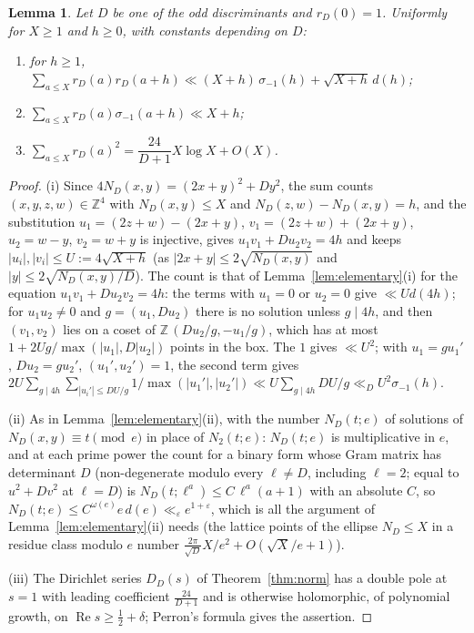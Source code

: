 \documentclass[11pt]{amsart}
\newtheorem{lemma}[theorem]{Lemma}
\theoremstyle{remark}
\newcommand{\Z}{\mathbb{Z}}
\newcommand{\e}{\varepsilon}
\begin{document}
\begin{lemma}\label{lem:elementaryD}
Let $D$ be one of the odd discriminants and $r_D(0)=1$. Uniformly for $X\ge1$ and $h\ge0$, with constants depending on $D$:
\begin{enumerate}[label=\textup{(\roman*)},leftmargin=2.2em]
\item for $h\ge1$, $\sum_{a\le X}r_D(a)r_D(a+h)\ll(X+h)\,\sigma_{-1}(h)+\sqrt{X+h}\,d(h)$;
\item $\sum_{a\le X}r_D(a)\sigma_{-1}(a+h)\ll X+h$;
\item $\sum_{a\le X}r_D(a)^2=\dfrac{24}{D+1}X\log X+O(X)$.
\end{enumerate}
\end{lemma}
\begin{proof}
(i) Since $4N_D(x,y)=(2x+y)^2+Dy^2$, the sum counts $(x,y,z,w)\in\Z^4$ with $N_D(x,y)\le X$ and $N_D(z,w)-N_D(x,y)=h$, and the substitution $u_1=(2z+w)-(2x+y)$, $v_1=(2z+w)+(2x+y)$, $u_2=w-y$, $v_2=w+y$ is injective, gives $u_1v_1+Du_2v_2=4h$ and keeps $|u_i|,|v_i|\le U:=4\sqrt{X+h}$ (as $|2x+y|\le2\sqrt{N_D(x,y)}$ and $|y|\le2\sqrt{N_D(x,y)/D}$). The count is that of Lemma~\ref{lem:elementary}(i) for the equation $u_1v_1+Du_2v_2=4h$: the terms with $u_1=0$ or $u_2=0$ give $\ll Ud(4h)$; for $u_1u_2\ne0$ and $g=(u_1,Du_2)$ there is no solution unless $g\mid4h$, and then $(v_1,v_2)$ lies on a coset of $\Z\,(Du_2/g,-u_1/g)$, which has at most $1+2Ug/\max(|u_1|,D|u_2|)$ points in the box. The $1$ gives $\ll U^2$; with $u_1=gu_1'$, $Du_2=gu_2'$, $(u_1',u_2')=1$, the second term gives $2U\sum_{g\mid4h}\sum_{|u_i'|\le DU/g}1/\max(|u_1'|,|u_2'|)\ll U\sum_{g\mid4h}DU/g\ll_DU^2\sigma_{-1}(h)$.

(ii) As in Lemma~\ref{lem:elementary}(ii), with the number $N_D(t;e)$ of solutions of $N_D(x,y)\equiv t\pmod e$ in place of $N_2(t;e)$: $N_D(t;e)$ is multiplicative in $e$, and at each prime power the count for a binary form whose Gram matrix has determinant $D$ (non-degenerate modulo every $\ell\ne D$, including $\ell=2$; equal to $u^2+Dv^2$ at $\ell=D$) is $N_D(t;\ell^a)\le C\,\ell^a(a+1)$ with an absolute $C$, so $N_D(t;e)\le C^{\omega(e)}e\,d(e)\ll_\e e^{1+\e}$, which is all the argument of Lemma~\ref{lem:elementary}(ii) needs (the lattice points of the ellipse $N_D\le X$ in a residue class modulo $e$ number $\frac{2\pi}{\sqrt D}X/e^2+O(\sqrt X/e+1)$).

(iii) The Dirichlet series $D_D(s)$ of Theorem~\ref{thm:norm} has a double pole at $s=1$ with leading coefficient $\frac{24}{D+1}$ and is otherwise holomorphic, of polynomial growth, on $\operatorname{Re}s\ge\frac12+\delta$; Perron's formula gives the assertion.
\end{proof}
\end{document}
